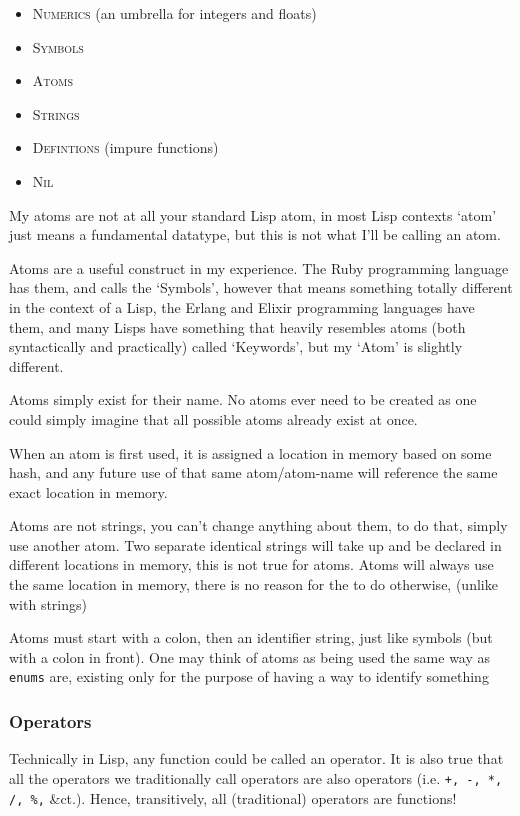 \documentclass{article}
\newcommand{\code}[1]{\texttt{#1}}
\newcommand{\etc}{{\&}ct.}
\begin{document}
      \begin{itemize}
        \item \textsc{Numerics} (an umbrella for integers and floats)
        \item \textsc{Symbols}
        \item \textsc{Atoms}
        \item \textsc{Strings}
        \item \textsc{Defintions} (impure functions)
        \item \textsc{Nil}
      \end{itemize}

      My atoms are not at all your standard Lisp atom, in most Lisp contexts
      `atom' just means a fundamental datatype, but this is not what I'll be
      calling an atom.

      Atoms are a useful construct in my experience. The Ruby programming language
      has them, and calls the `Symbols', however that means something totally
      different in the context of a Lisp, the Erlang and Elixir programming
      languages have them, and many Lisps have something that heavily resembles
      atoms (both syntactically and practically) called `Keywords', but my `Atom'
      is slightly different.

      Atoms simply exist for their name.
      No atoms ever need to be created as
      one could simply imagine that all
      possible atoms already exist at once.

      When an atom is first used, it is assigned
      a location in memory based on some hash, and
      any future use of that same atom/atom-name will
      reference the same exact location in memory.

      Atoms are not strings, you can't change anything
      about them, to do that, simply use another atom.
      Two separate identical strings will take up and be
      declared in different locations in memory, this is
      not true for atoms. Atoms will always use the same
      location in memory, there is no reason for the to
      do otherwise, (unlike with strings)

      Atoms must start with a colon, then an identifier
      string, just like symbols (but with a colon in front).
      One may think of atoms as being used the same way
      as \code{enums} are, existing only for the purpose of
      having a way to identify something

    \subsubsection{Operators}
      Technically in Lisp, any function could be called an operator.
      It is also true that all the operators we traditionally call operators
      are also operators (i.e. \code{+, -, *, /, \%,} \etc).
      Hence, transitively, all (traditional) operators are functions!
\end{document}
